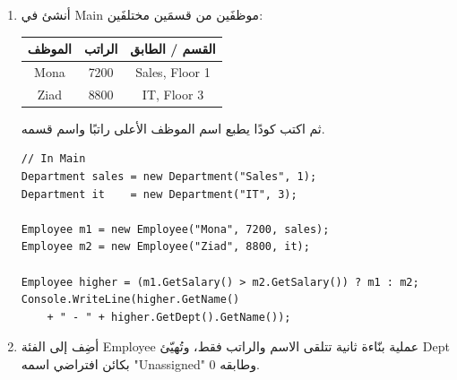 \documentclass[14pt]{extarticle}
\begin{document}
\begin{enumerate}
اختبِرها في \textenglish{Main}.

\ifwithsols
\begin{boxSolution}
\begin{english}
{\small
\begin{verbatim}
// Inside class Employee
public bool IsInSameDept(Employee other)
{
    return this.Dept.GetName() == other.Dept.GetName();
}

// In Main
if (e1.IsInSameDept(e2))
    Console.WriteLine("Same department.");
else
    Console.WriteLine("Different departments.");
\end{verbatim}
}
\end{english}
\end{boxSolution}
\clearpage
\fi

\item
أنشئ في \textenglish{Main} موظفَين من قسمَين مختلفَين:

\begin{center}
\begin{tabular}{|c|c|c|}
\hline
\textbf{الموظف} & \textbf{الراتب} & \textbf{القسم / الطابق} \\
\hline
\textenglish{Mona}  & \textenglish{7200} & \textenglish{Sales, Floor 1} \\
\textenglish{Ziad}  & \textenglish{8800} & \textenglish{IT, Floor 3} \\
\hline
\end{tabular}
\end{center}

ثم اكتب كودًا يطبع اسم الموظف الأعلى راتبًا واسم قسمه.

\ifwithsols
\begin{boxSolution}
\begin{english}
{\small
\begin{verbatim}
// In Main
Department sales = new Department("Sales", 1);
Department it    = new Department("IT", 3);

Employee m1 = new Employee("Mona", 7200, sales);
Employee m2 = new Employee("Ziad", 8800, it);

Employee higher = (m1.GetSalary() > m2.GetSalary()) ? m1 : m2;
Console.WriteLine(higher.GetName()
    + " - " + higher.GetDept().GetName());
\end{verbatim}
}
\end{english}
\end{boxSolution}
\clearpage
\fi

\item
أضِف إلى الفئة \textenglish{Employee} عملية بنّاءة ثانية تتلقى الاسم والراتب فقط،
وتُهيّئ \textenglish{Dept} بكائن افتراضي اسمه \textenglish{"Unassigned"} وطابقه \textenglish{0}.


\end{enumerate}
\end{document}
